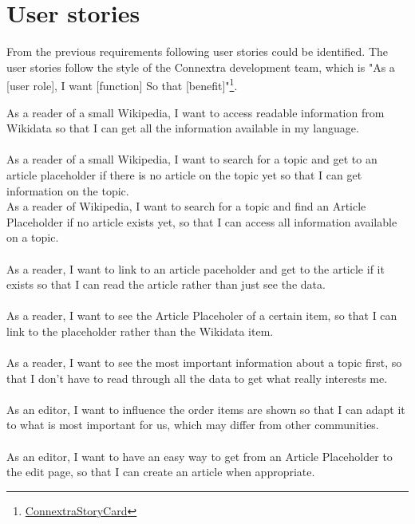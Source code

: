 \chapter{User stories}

From the previous requirements following user stories could be identified. The user stories follow the style of the Connextra development team, which is "As a [user role], I want [function] So that [benefit]"\footnote{\href{http://agilecoach.typepad.com/photos/connextra_user_story_2001/connextrastorycard.html}{ConnextraStoryCard}}. \\


As a reader of a small Wikipedia, I want to access readable information from Wikidata so that I can get all the information available in my language. \\
\\
As a reader of a small Wikipedia, I want to search for a topic and get to an article placeholder if there is no article on the topic yet so that I can get information on the topic. \\ As a reader of Wikipedia, I want to search for a topic and find an Article Placeholder if no article exists yet, so that I can access all information available on a topic. \\
\\
As a reader, I want to link to an article paceholder and get to the article if it exists so that I can read the article rather than just see the data. \\
\\
As a reader, I want to see the Article Placeholer of a certain item, so that I can link to the placeholder rather than the Wikidata item. \\
\\
As a reader, I want to see the most important information about a topic first, so that I don't have to read through all the data to get what really interests me. \\
\\
As an editor, I want to influence the order items are shown so that I can adapt it to what is most important for us, which may differ from other communities.\\
\\
As an editor, I want to have an easy way to get from an Article Placeholder to the edit page, so that I can create an article when appropriate. \\
